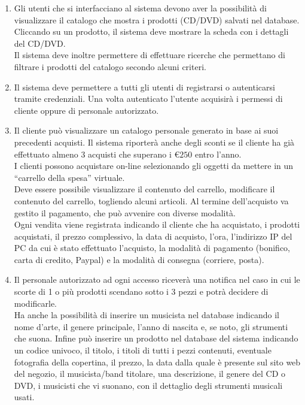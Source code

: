 \documentclass[a4paper,12pt]{report}
\begin{document}
	\begin{enumerate}
		\item Gli utenti che si interfacciano al sistema devono aver la possibilità di visualizzare il catalogo che mostra i prodotti (CD/DVD) salvati nel database. Cliccando su un prodotto, il sistema deve mostrare la scheda con i dettagli del CD/DVD.\\
		Il sistema deve inoltre permettere di effettuare ricerche che permettano di filtrare i prodotti del catalogo secondo alcuni criteri.
		
		\item Il sistema deve permettere a tutti gli utenti di registrarsi o autenticarsi tramite credenziali. Una volta autenticato l'utente acquisirà i permessi di cliente oppure di personale autorizzato.
		
		\item Il cliente può visualizzare un catalogo personale generato in base ai suoi precedenti acquisti. Il sistema riporterà anche degli sconti se il cliente ha già effettuato almeno 3 acquisti che superano i \euro$250$ entro l'anno.\\
		I clienti possono acquistare on-line selezionando gli oggetti da mettere in un “carrello della spesa” virtuale.\\
		Deve essere possibile visualizzare il contenuto del carrello, modificare il contenuto del carrello, togliendo alcuni articoli. Al termine dell’acquisto va gestito il pagamento, che può avvenire con diverse modalità.\\
		Ogni vendita viene registrata indicando il cliente che ha acquistato, i prodotti acquistati, il prezzo complessivo, la data di acquisto, l’ora, l’indirizzo IP del PC da cui è stato effettuato l’acquisto, la modalità di pagamento (bonifico, carta di credito, Paypal) e la modalità di consegna (corriere, posta).
		
		\item Il personale autorizzato ad ogni accesso riceverà una notifica nel caso in cui le scorte di 1 o più prodotti scendano sotto i 3 pezzi e potrà decidere di modificarle.\\
		Ha anche la possibilità di inserire un musicista nel database indicando il nome d’arte, il genere principale, l’anno di nascita e, se noto, gli strumenti che suona. Infine può inserire un prodotto nel database del sistema indicando un codice univoco, il titolo, i titoli di tutti i pezzi contenuti,
		eventuale fotografia della copertina, il prezzo, la data dalla quale è presente sul sito web del negozio, il musicista/band titolare, una descrizione, il genere del CD o DVD, i musicisti che vi suonano, con il dettaglio degli strumenti musicali usati.
	\end{enumerate}
\end{document}
